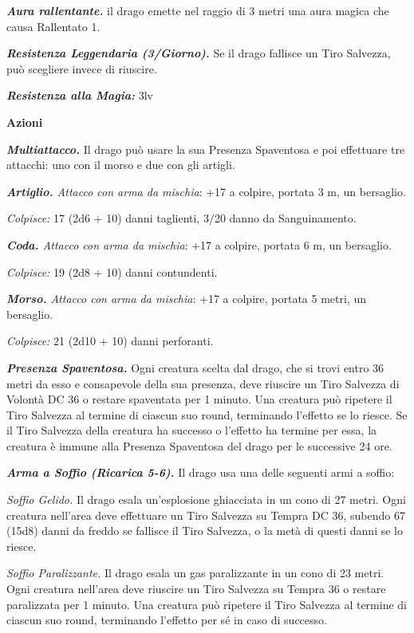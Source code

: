 \begin{multicols}{2}
{\emph{\textbf{Aura rallentante.}} il drago emette nel raggio di 3 metri una aura magica che causa Rallentato 1.

\emph{\textbf{Resistenza Leggendaria (3/Giorno).}} Se il drago fallisce un Tiro Salvezza, può scegliere invece di riuscire.

\emph{\textbf{Resistenza alla Magia:}} 3lv

\textbf{Azioni}

\emph{\textbf{Multiattacco.}} Il drago può usare la sua Presenza Spaventosa e poi effettuare tre attacchi: uno con il morso e due con gli artigli.

\emph{\textbf{Artiglio.} Attacco con arma da mischia}: +17 a colpire, portata 3 m, un bersaglio.

\emph{Colpisce:} 17 (2d6 + 10) danni taglienti, 3/20 danno da Sanguinamento.

\emph{\textbf{Coda.} Attacco con arma da mischia}: +17 a colpire, portata 6 m, un bersaglio.

\emph{Colpisce:} 19 (2d8 + 10) danni contundenti.

\emph{\textbf{Morso.} Attacco con arma da mischia}: +17 a colpire, portata 5 metri, un bersaglio.

\emph{Colpisce:} 21 (2d10 + 10) danni perforanti.

\emph{\textbf{Presenza Spaventosa.}} Ogni creatura scelta dal drago, che si trovi entro 36 metri da esso e consapevole della sua presenza, deve riuscire un Tiro Salvezza di Volontà DC 36 o restare spaventata per 1 minuto. Una creatura può ripetere il Tiro Salvezza al termine di ciascun suo round, terminando l'effetto se lo riesce. Se il Tiro Salvezza della creatura ha successo o l'effetto ha termine per essa, la creatura è immune alla Presenza Spaventosa del drago per le successive 24 ore.

\emph{\textbf{Arma a Soffio (Ricarica 5-6).}} Il drago usa una delle seguenti armi a soffio:

\emph{Soffio Gelido.} Il drago esala un'esplosione ghiacciata in un cono di 27 metri. Ogni creatura nell'area deve effettuare un Tiro Salvezza su Tempra DC 36, subendo 67 (15d8) danni da freddo se fallisce il Tiro Salvezza, o la metà di questi danni se lo riesce.

\emph{Soffio Paralizzante.} Il drago esala un gas paralizzante in un cono di 23 metri. Ogni creatura nell'area deve riuscire un Tiro Salvezza su Tempra 36 o restare paralizzata per 1 minuto. Una creatura può ripetere il Tiro Salvezza al termine di ciascun suo round, terminando l'effetto per sé in caso di successo.

}
\end{multicols}
